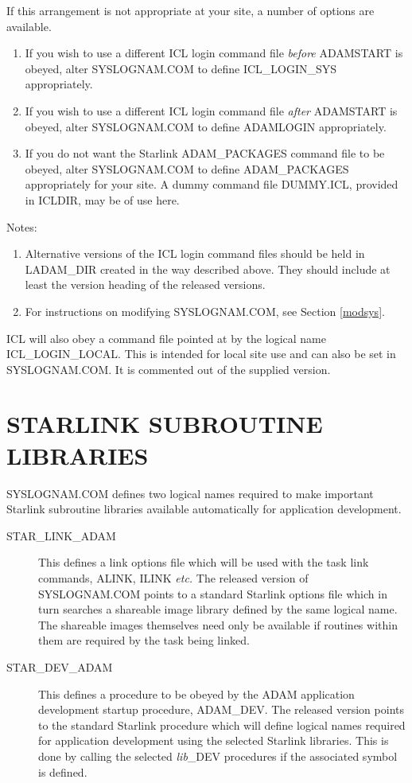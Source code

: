 If this arrangement is not appropriate at your site, a number of options are
available.
\begin{enumerate}
\item If you wish to use a different ICL login command file {\em before}
ADAMSTART is obeyed, alter SYSLOGNAM\-.COM to define ICL\-\_LOGIN\-\_SYS 
appropriately.
\item If you wish to use a different ICL login command file {\em after}
ADAM\-START is obeyed, alter SYS\-LOGNAM\-.COM to define ADAM\-LOGIN
appropriately.
\item If you do not want the Starlink ADAM\-\_PACK\-AGES command file to be 
obeyed, alter SYS\-LOG\-NAM.COM to define ADAM\-\_PACK\-AGES appropriately for
your site.
A dummy command file DUMMY\-.ICL, provided in ICLDIR, may be of use here.
\end{enumerate}

Notes:
\begin{enumerate}
\item Alternative versions of the ICL login command files should be held in
LADAM\_DIR created in the way described above.
They should include at least the version heading of the released versions.
\item For instructions on modifying SYSLOGNAM.COM, see Section \ref{modsys}.
\end{enumerate}

ICL will also obey a command file pointed at by the logical name 
ICL\_LOGIN\_LOCAL.
This is intended for local site use and can also be set in SYSLOGNAM.COM.
It is commented out of the supplied version.

\section{STARLINK SUBROUTINE LIBRARIES}
\label{starlibs}
SYSLOGNAM.COM defines two logical names required to make important Starlink 
subroutine libraries available automatically for application development.
\begin{description}
\item[STAR\_LINK\_ADAM] This defines a link options file which will be used
with the task link commands, ALINK, ILINK {\em etc.}
The released version of SYSLOGNAM.COM points to a standard Starlink options 
file which in turn searches a shareable image library defined by the same 
logical name. The shareable images themselves need only be available if routines within
them are required by the task being linked.
\item[STAR\_DEV\_ADAM] This defines a procedure to be obeyed by 
the ADAM application development startup procedure, ADAM\_DEV.
The released version points to the standard Starlink procedure which will
define logical names required for application development using the selected
Starlink libraries.
This is done by calling the selected {\em lib}\_DEV procedures if the
associated symbol is defined.
\end{description}

